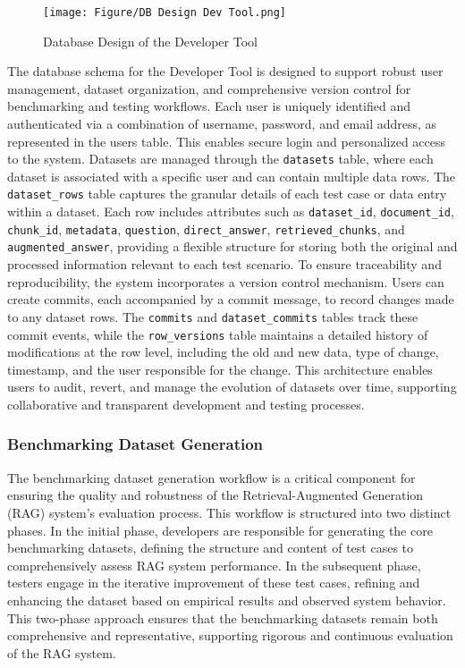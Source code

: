 \documentclass[../Main.tex]{subfiles}
\begin{document}
{{	\begin{figure}[H]
		\centering
		\texttt{[image: Figure/DB Design Dev Tool.png]}
		\caption{Database Design of the Developer Tool}
		\label{fig:Database_Design}
	\end{figure}
	The database schema for the Developer Tool is designed to support robust user management, dataset organization, and comprehensive version control for benchmarking and testing workflows.
	Each user is uniquely identified and authenticated via a combination of username, password, and email address, as represented in the users table. This enables secure login and personalized access to the system.
	Datasets are managed through the \texttt{datasets} table, where each dataset is associated with a specific user and can contain multiple data rows. The \texttt{dataset\_rows} table captures the granular details of each test case or data entry within a dataset. Each row includes attributes such as \texttt{dataset\_id}, \texttt{document\_id}, \texttt{chunk\_id}, \texttt{metadata}, \texttt{question}, \texttt{direct\_answer}, \texttt{retrieved\_chunks}, and \texttt{augmented\_answer}, providing a flexible structure for storing both the original and processed information relevant to each test scenario.
	To ensure traceability and reproducibility, the system incorporates a version control mechanism. Users can create commits, each accompanied by a commit message, to record changes made to any dataset rows. The \texttt{commits} and \texttt{dataset\_commits} tables track these commit events, while the \texttt{row\_versions} table maintains a detailed history of modifications at the row level, including the old and new data, type of change, timestamp, and the user responsible for the change. This architecture enables users to audit, revert, and manage the evolution of datasets over time, supporting collaborative and transparent development and testing processes.
	
	\subsubsection{Benchmarking Dataset Generation}
	\label{section:4.4.3.2_benchmarking_dataset_generation}
	The benchmarking dataset generation workflow is a critical component for ensuring the quality and robustness of the Retrieval-Augmented Generation (RAG) system's evaluation process. This workflow is structured into two distinct phases. In the initial phase, developers are responsible for generating the core benchmarking datasets, defining the structure and content of test cases to comprehensively assess RAG system performance. In the subsequent phase, testers engage in the iterative improvement of these test cases, refining and enhancing the dataset based on empirical results and observed system behavior. This two-phase approach ensures that the benchmarking datasets remain both comprehensive and representative, supporting rigorous and continuous evaluation of the RAG system.
	
}}
\end{document}
